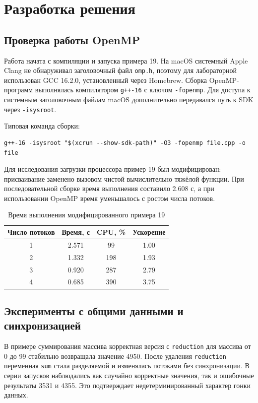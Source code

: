 \documentclass[12pt,a4paper]{article}
\begin{document}
\section{Разработка решения}

\subsection{Проверка работы OpenMP}

Работа начата с компиляции и запуска примера 19. На macOS системный Apple Clang не обнаруживал заголовочный файл \texttt{omp.h}, поэтому для лабораторной использован GCC 16.2.0, установленный через Homebrew. Сборка OpenMP-программ выполнялась компилятором \texttt{g++-16} с ключом \texttt{-fopenmp}. Для доступа к системным заголовочным файлам macOS дополнительно передавался путь к SDK через \texttt{-isysroot}.

Типовая команда сборки:

\begin{verbatim}
g++-16 -isysroot "$(xcrun --show-sdk-path)" -O3 -fopenmp file.cpp -o file
\end{verbatim}

Для исследования загрузки процессора пример 19 был модифицирован: присваивание заменено вызовом чистой вычислительно тяжёлой функции. При последовательной сборке время выполнения составило 2.608 с, а при использовании OpenMP время уменьшалось с ростом числа потоков.

\begin{table}[H]
\centering
\caption{Время выполнения модифицированного примера 19}
\begin{tabular}{cccc}
\toprule
Число потоков & Время, с & CPU, \% & Ускорение \\
\midrule
1 & 2.571 & 99  & 1.00 \\
2 & 1.332 & 198 & 1.93 \\
3 & 0.920 & 287 & 2.79 \\
4 & 0.685 & 390 & 3.75 \\
\bottomrule
\end{tabular}
\end{table}

\subsection{Эксперименты с общими данными и синхронизацией}

В примере суммирования массива корректная версия с \texttt{reduction} для массива от 0 до 99 стабильно возвращала значение 4950. После удаления \texttt{reduction} переменная \texttt{sum} стала разделяемой и изменялась потоками без синхронизации. В серии запусков наблюдались как случайно корректные значения, так и ошибочные результаты 3531 и 4355. Это подтверждает недетерминированный характер гонки данных.
\end{document}
